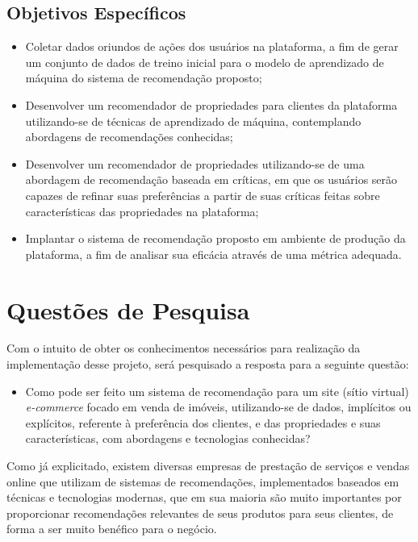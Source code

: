 \subsection{Objetivos Específicos}

\begin{itemize}
    \item Coletar dados oriundos de ações dos usuários na plataforma, a fim de gerar um conjunto de dados de treino inicial para o modelo de aprendizado de máquina do sistema de recomendação proposto;
    \item Desenvolver um recomendador de propriedades para clientes da plataforma utilizando-se de técnicas de aprendizado de máquina, contemplando abordagens de recomendações conhecidas;
    \item Desenvolver um recomendador de propriedades utilizando-se de uma abordagem de recomendação baseada em críticas, em que os usuários serão capazes de refinar suas preferências a partir de suas críticas feitas sobre características das propriedades na plataforma;
    \item Implantar o sistema de recomendação proposto em ambiente de produção da plataforma, a fim de analisar sua eficácia através de uma métrica adequada.
\end{itemize}

\section{Questões de Pesquisa}

Com o intuito de obter os conhecimentos necessários para realização da implementação desse projeto, será pesquisado a resposta para a seguinte questão:
\begin{itemize}
    \item Como pode ser feito um sistema de recomendação para um site (sítio virtual) \textit{e-commerce} focado em venda de imóveis, utilizando-se de dados, implícitos ou explícitos, referente à preferência dos clientes, e das propriedades e suas características, com abordagens e tecnologias conhecidas?
\end{itemize}

Como já explicitado, existem diversas empresas de prestação de serviços e vendas online que utilizam de sistemas de recomendações, implementados baseados em técnicas e tecnologias modernas, que em sua maioria são muito importantes por proporcionar recomendações relevantes de seus produtos para seus clientes, de forma a ser muito benéfico para o negócio. 

